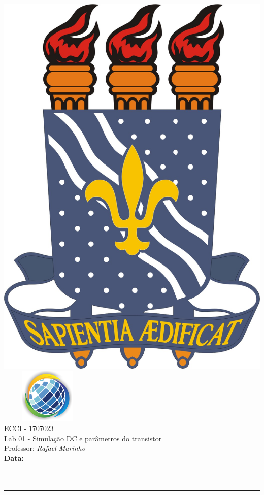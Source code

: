 \documentclass[10pt,addpoints]{exam}%
\newcommand{\class}{ECCI - 1707023}
\newcommand{\examnum}{Lab 01 - Simulação DC e parâmetros do transistor}
\newcommand{\examdate}{}
\begin{document}
\noindent
\begin{minipage}[c]{0.7\linewidth}
\includegraphics[scale=0.14]{logo/logo-ufpb.jpg}~~~~~\includegraphics[scale=2]{logo/logo-cear.png}\\[6pt]
{\large \class}\\[4pt]
{\examnum}\\[4pt]
Professor: {\emph{Rafael Marinho}}\\[4pt]
\textbf{Data: \examdate}\\[10pt]
\noindent{}\makebox[3in]{\hrulefill}\\[10pt]
\noindent{}\makebox[3in]{\hrulefill}\\
\end{minipage}
\hfill
\begin{minipage}[t]{0.3\linewidth}
\end{minipage}
\noindent
\rule{\textwidth}{1pt}\vspace{10pt}

\vfill
\end{document}
